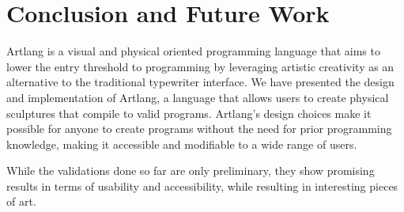 
\section{Conclusion and Future Work}
\label{sec:conclusion}
Artlang is a visual and physical oriented programming language that aims to lower the entry threshold to programming by leveraging artistic creativity as an alternative to the traditional typewriter interface.
We have presented the design and implementation of Artlang, a language that allows users to create physical sculptures that compile to valid programs.
Artlang's design choices make it possible for anyone to create programs without the need for prior programming knowledge, making it accessible and modifiable to a wide range of users.

While the validations done so far are only preliminary, they show promising results in terms of usability and accessibility, while resulting in interesting pieces of art.

\endinput

